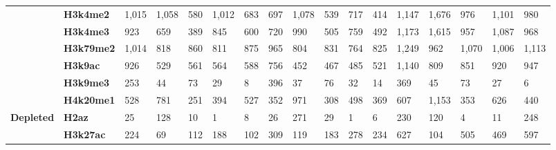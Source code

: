 \begin{sidewaystable}[!ht]
\begin{tabular}{ll|lllll|lllll|lllll}
                  & \textbf{H3k4me2}  & 1,015            & 1,058           & 580             & 1,012          & 683           & 697              & 1,078           & 539             & 717            & 414           & 1,147            & 1,676           & 976             & 1,101          & 980           \\
                  & \textbf{H3k4me3}  & 923              & 659             & 389             & 845            & 600           & 720              & 990             & 505             & 759            & 492           & 1,173            & 1,615           & 957             & 1,087          & 968           \\
                  & \textbf{H3k79me2} & 1,014            & 818             & 860             & 811            & 875           & 965              & 804             & 831             & 764            & 825           & 1,249            & 962             & 1,070           & 1,006          & 1,113         \\
                  & \textbf{H3k9ac}   & 926              & 529             & 561             & 564            & 588           & 756              & 452             & 467             & 485            & 521           & 1,140            & 809             & 851             & 920            & 947           \\
                  & \textbf{H3k9me3}  & 253              & 44              & 73              & 29             & 8             & 396              & 37              & 76              & 32             & 14            & 369              & 45              & 73              & 27             & 6             \\
                  & \textbf{H4k20me1} & 528              & 781             & 251             & 394            & 527           & 352              & 971             & 308             & 498            & 369           & 607              & 1,153           & 353             & 626            & 440           \\
\textbf{Depleted} & \textbf{H2az}     & 25               & 128             & 10              & 1              & 8             & 26               & 271             & 29              & 1              & 6             & 230              & 120             & 4               & 11             & 248           \\
                  & \textbf{H3k27ac}  & 224              & 69              & 112             & 188            & 102           & 309              & 119             & 183             & 278            & 234           & 627              & 104             & 505             & 469            & 597           \\

\end{tabular}
\end{sidewaystable}
